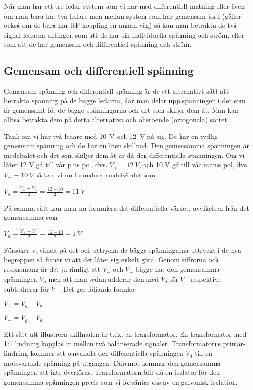 När man har ett tre-ledar system som vi har med differentiell matning eller
även om man bara har två ledare men mellan system som har gemensam jord
(gäller också om de bara har RF-koppling en annan väg) så kan man betrakta
de två signal-ledarna antingen som att de har sin individuella spänning och
ström, eller som att de har gemensam och differentiell spänning och ström.

\subsection{Gemensam och differentiell spänning}
\label{comdiffv}

Gemensam spänning och differentiell spänning är de ett alternativt sätt att
betrakta spänning på de bägge ledarna, där man delar upp spänningen i det som
är gemensamt för de bägge spänningarna och det som skiljer dem åt. Man kan
alltså betrakta dem på detta alternativa och oberoende (ortogonala) sättet.

Tänk om vi har två ledare med 10~V och 12~V på sig. De har en tydlig gemensam
spänning och de har en liten skillnad. Den gemensamma spänningen är medeltalet
och det som skiljer dem åt är då den differentiella spänningen. Om vi låter
12 V gå till vår plus pol, dvs. \(V_+ = 12\ V\), och 10 V gå till vår minus pol,
dvs. \(V_- = 10\ V\) så kan vi nu formulera medelvärdet som

\(V_g = \frac{V_+ + V_-}{2} = \frac{12+10}{2} = 11\ V\)

På samma sätt kan man nu formulera det differentiella värdet, avvikelsen från
det gemensamma som

\(V_d = \frac{V_+ - V_-}{2} = \frac{12-10}{2} = 1\ V\)

Försöker vi vända på det och uttrycka de bägge spänningarna uttryckt i de nya
begreppen så finner vi att det låter sig enkelt göra. Genom siffrorna och
resonemang är det ju rimligt att \(V_+\) och \(V_-\) bägge har den gemensamma
spänningen \(V_g\) men att man sedan adderar den med \(V_d\) för \(V_+\)
respektive subtraherar för \(V_-\). Det ger följande formler:

\(V_+ = V_g + V_d\)

\(V_- = V_g - V_d\)

Ett sätt att illustrera skillnaden är t.ex. en transformator. En transformator
med 1:1 lindning kopplas in mellan två balanserade signaler. Transformatorns
primär-lindning kommer att omvandla den differentiella spänningen \(V_d\) till en
motsvarande spänning på utgången. Däremot kommer den gemensamma spänningen att
inte överföras. Transformatorn blir då en isolator för den gemensamma spänningen
precis som vi förväntas oss av en galvanisk isolation.

